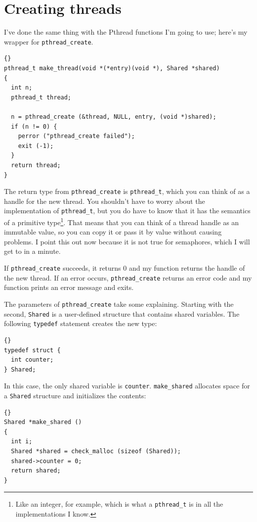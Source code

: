 \documentclass{book}
\begin{document}
\section{Creating threads}

I've done the same thing with the Pthread functions I'm going to use;
here's my wrapper for {\tt pthread\_create}.

\begin{lstlisting}[title={},escapeinside={}]{}
pthread_t make_thread(void *(*entry)(void *), Shared *shared)
{
  int n;
  pthread_t thread;

  n = pthread_create (&thread, NULL, entry, (void *)shared);
  if (n != 0) {
    perror ("pthread_create failed");
    exit (-1);
  }
  return thread;
}
\end{lstlisting}

The return type from {\tt pthread\_create} is {\tt pthread\_t},
which you can think of as a handle for the new thread.  You
shouldn't have to worry about the implementation of {\tt pthread\_t},
but you do have to know that it has the semantics of a primitive
type\footnote{Like an integer, for example, which is what a
{\tt pthread\_t} is in all the implementations I know.}.  That
means that you can think of a thread handle as an immutable
value, so you can copy it or pass it by value without causing
problems.  I point this out now because it is not true for
semaphores, which I will get to in a minute.

If {\tt pthread\_create} succeeds, it returns 0 and my function
returns the handle of the new thread.
If an error occurs, {\tt pthread\_create} 
returns an error code and my function prints an error message
and exits.

The parameters of {\tt pthread\_create} take some
explaining.  Starting with the second,
{\tt Shared}
is a user-defined structure that contains shared variables.
The following {\tt typedef} statement creates the new type:

\begin{lstlisting}[title={}]{}
typedef struct {
  int counter;
} Shared;
\end{lstlisting}

In this case, the only shared variable is {\tt counter}.
{\tt make\_shared} allocates
space for a {\tt Shared} structure and initializes the contents:

\begin{lstlisting}[title={}]{}
Shared *make_shared ()
{
  int i;
  Shared *shared = check_malloc (sizeof (Shared));
  shared->counter = 0;
  return shared;
}
\end{lstlisting}
\end{document}
